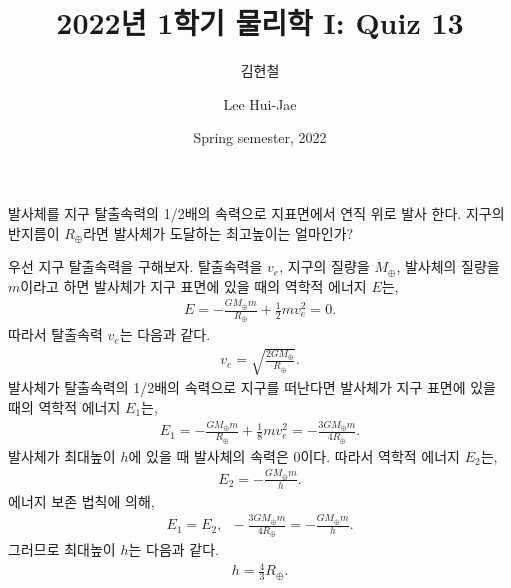 \documentclass[floatfix,nofootinbib,superscriptaddress,fleqn]{revtex4-2}
\begin{document}
\title{\Large 2022년 1학기 물리학 I: Quiz 13}
\author{김현철} 
\author{Lee Hui-Jae} 
\date{Spring semester, 2022}


\vspace{1.cm}

\maketitle


발사체를 지구 탈출속력의 1/2배의 속력으로 지표면에서 연직 위로 발사
한다. 지구의 반지름이 $R_{\oplus}$라면 발사체가 도달하는 최고높이는
얼마인가? 

우선 지구 탈출속력을 구해보자. 탈출속력을 $v_e$, 지구의 질량을 $M_\oplus$, 
발사체의 질량을 $m$이라고 하면 발사체가 지구 표면에 있을 때의 역학적 에너지 $E$는,
\begin{align}
    E = -\frac{GM_\oplus m}{R_\oplus} + \frac{1}{2}mv^2_e=0.
\end{align}
따라서 탈출속력 $v_e$는 다음과 같다.
\begin{align}
    v_e = \sqrt{\frac{2GM_\oplus}{R_\oplus}}.
\end{align}
발사체가 탈출속력의 1/2배의 속력으로 지구를 떠난다면 발사체가 지구 표면에 있을 때의 
역학적 에너지 $E_1$는,
\begin{align}
    E_1 = -\frac{GM_\oplus m}{R_\oplus} + \frac{1}{8}mv_e^2
    =-\frac{3GM_\oplus m}{4R_\oplus}.
\end{align}
발사체가 최대높이 $h$에 있을 때 발사체의 속력은 0이다. 따라서 역학적 에너지 $E_2$는,
\begin{align}
    E_2 = -\frac{GM_\oplus m}{h}.
\end{align}
에너지 보존 법칙에 의해,
\begin{align}
    E_1 =E_2,\,\,\,
    -\frac{3GM_\oplus m}{4R_\oplus}=-\frac{GM_\oplus m}{h}.
\end{align}
그러므로 최대높이 $h$는 다음과 같다.
\begin{align}
    h = \frac{4}{3}R_\oplus.
\end{align}
\vspace{1.cm}
\end{document}
